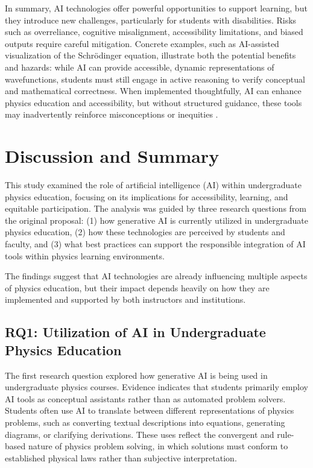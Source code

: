 \documentclass[]{aastex701}
\begin{document}
In summary, AI technologies offer powerful opportunities to support learning, but they introduce new challenges, particularly for students with disabilities. Risks such as overreliance, cognitive misalignment, accessibility limitations, and biased outputs require careful mitigation. Concrete examples, such as AI-assisted visualization of the Schr\"{o}dinger equation, illustrate both the potential benefits and hazards: while AI can provide accessible, dynamic representations of wavefunctions, students must still engage in active reasoning to verify conceptual and mathematical correctness. When implemented thoughtfully, AI can enhance physics education and accessibility, but without structured guidance, these tools may inadvertently reinforce misconceptions or inequities \autocite{Paglialunga2025, Voultsiou2025, Khowaja2025, Weijers2025, Singh2001}.


\section{Discussion and Summary}
\label{sec:discussion}
This study examined the role of artificial intelligence (AI) within undergraduate physics education, focusing on its implications for accessibility, learning, and equitable participation. The analysis was guided by three research questions from the original proposal: (1) how generative AI is currently utilized in undergraduate physics education, (2) how these technologies are perceived by students and faculty, and (3) what best practices can support the responsible integration of AI tools within physics learning environments.

The findings suggest that AI technologies are already influencing multiple aspects of physics education, but their impact depends heavily on how they are implemented and supported by both instructors and institutions.


\subsection{RQ1: Utilization of AI in Undergraduate Physics Education}

The first research question explored how generative AI is being used in undergraduate physics courses. Evidence indicates that students primarily employ AI tools as conceptual assistants rather than as automated problem solvers. Students often use AI to translate between different representations of physics problems, such as converting textual descriptions into equations, generating diagrams, or clarifying derivations. These uses reflect the convergent and rule-based nature of physics problem solving, in which solutions must conform to established physical laws rather than subjective interpretation.
\end{document}
